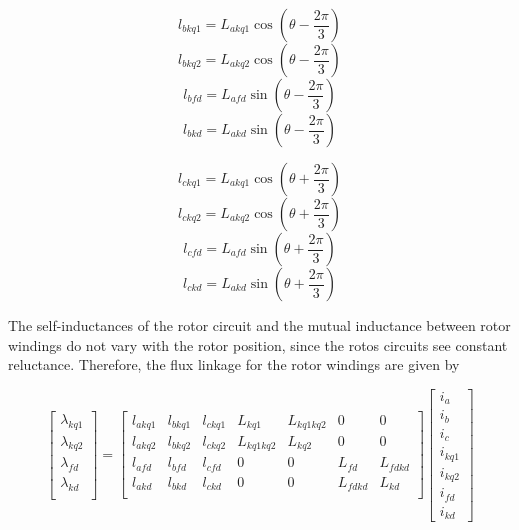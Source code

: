 \begin{equation}
	l_{bkq1} = L_{akq1} \cos (\theta - \dfrac{2 \pi}{3})
\end{equation}
\begin{equation}
	l_{bkq2} = L_{akq2} \cos (\theta - \dfrac{2 \pi}{3})
\end{equation}
\begin{equation}
	l_{bfd} = L_{afd} \sin (\theta - \dfrac{2 \pi}{3})
\end{equation}
\begin{equation}
	l_{bkd} = L_{akd} \sin (\theta - \dfrac{2 \pi}{3})
\end{equation}

\begin{equation}
	l_{ckq1} = L_{akq1} \cos (\theta + \dfrac{2 \pi}{3})
\end{equation}
\begin{equation}
	l_{ckq2} = L_{akq2} \cos (\theta + \dfrac{2 \pi}{3})
\end{equation}
\begin{equation}
	l_{cfd} = L_{afd} \sin (\theta + \dfrac{2 \pi}{3})
\end{equation}
\begin{equation}
	l_{ckd} = L_{akd} \sin (\theta + \dfrac{2 \pi}{3})
\end{equation}

The self-inductances of the rotor circuit and the mutual inductance between rotor windings do not vary with the rotor position, since the rotos circuits see constant reluctance. Therefore, the flux linkage for the rotor windings are given by

\begin{equation} \label{eq:FluxRotor}
	\begin{bmatrix}
		\lambda_{kq1} \\
		\lambda_{kq2} \\
		\lambda_{fd} \\
		\lambda_{kd} \\
	\end{bmatrix}
	=
	\begin{bmatrix}
		l_{akq1} & l_{bkq1} & l_{ckq1} & L_{kq1} & L_{kq1kq2} & 0 & 0 \\  
		l_{akq2} & l_{bkq2} & l_{ckq2} & L_{kq1kq2} & L_{kq2} & 0 & 0 \\ 
		l_{afd} & l_{bfd} & l_{cfd} & 0 & 0 & L_{fd} & L_{fdkd} \\
		l_{akd} & l_{bkd} & l_{ckd} & 0 & 0 & L_{fdkd} & L_{kd} \\  
	\end{bmatrix}
	\begin{bmatrix}
		i_a \\
		i_b \\
		i_c \\
		i_{kq1} \\
		i_{kq2} \\
		i_{fd} \\
		i_{kd}
	\end{bmatrix}
\end{equation}

